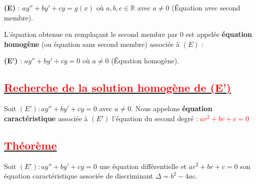 \documentclass[12pt,a4paper]{article}
\begin{document}
\noindent\textbf{(E)} : $ay'' + by' + cy = g(x)$ \quad où $a, b, c \in \mathbb{R}$ avec $a \neq 0$ (Équation avec second membre).

\medskip

\noindent L'équation obtenue en remplaçant le second membre par $0$ est appelée \textbf{équation homogène} (ou équation sans second membre) associée à $(E)$ :

\noindent\textbf{(E')} : $ay'' + by' + cy = 0$ \quad où $a \neq 0$ (Équation homogène).

\subsection*{\underline{\textbf{\textcolor{red}{ Recherche de la solution homogène de (E')}}}}

Soit $(E') : ay'' + by' + cy = 0$ avec $a \neq 0$. 
Nous appelons \textbf{équation caractéristique} associée à $(E')$ l'équation du second degré : 
\textcolor{red}{$ ar^2 + br + c = 0 $}

\subsection*{\underline{\textbf{\textcolor{red}{Théorème}}}}

Soit $(E') : ay'' + by' + cy = 0$ une équation différentielle et $ar^2 + br + c = 0$ son équation caractéristique associée de discriminant $\Delta = b^2 - 4ac$.
\end{document}
